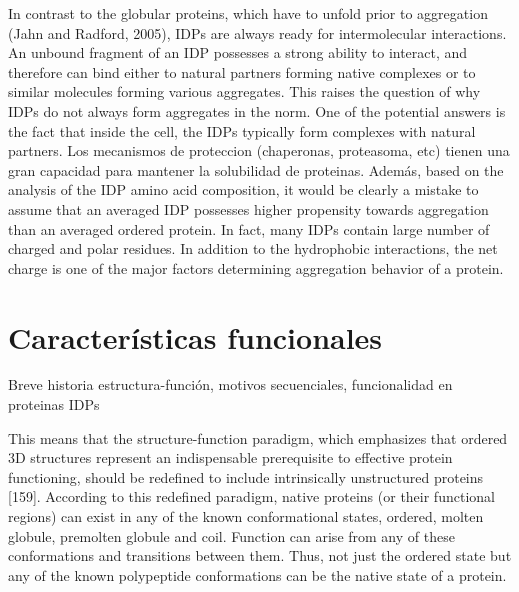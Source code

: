 In contrast to the globular proteins, which have to unfold prior to aggregation (Jahn and Radford, 2005), IDPs are always ready for intermolecular interactions. 
An unbound fragment of an IDP possesses a strong ability to interact, and therefore can bind either to natural partners forming native complexes or to similar molecules forming various aggregates. 
This raises the question of why IDPs do not always form aggregates in the norm. One of the potential answers is the fact that inside the cell, the IDPs typically form complexes with natural partners.
Los mecanismos de proteccion (chaperonas, proteasoma, etc) tienen una gran capacidad para mantener la solubilidad de proteinas.
Además, based on the analysis of the IDP amino acid composition, it would be clearly a mistake to assume that an averaged IDP possesses higher propensity towards aggregation than an averaged ordered
protein. In fact, many IDPs contain large number of charged and polar residues. In addition to the hydrophobic interactions, the net charge is one of the major factors determining aggregation behavior of a protein.













\section{Características funcionales}
Breve historia estructura-función, motivos secuenciales, funcionalidad en proteinas IDPs


This means that the structure-function paradigm, which emphasizes that ordered 3D structures represent an indispensable prerequisite to effective protein functioning, should be redefined to include intrinsically unstructured proteins [159]. According to this redefined paradigm, native proteins (or their functional regions) can exist in any of the known conformational states, ordered, molten globule, premolten globule and coil. Function can arise from any of these conformations
and transitions between them. Thus, not just the ordered state but any of the known polypeptide conformations can be the native state of a protein.




